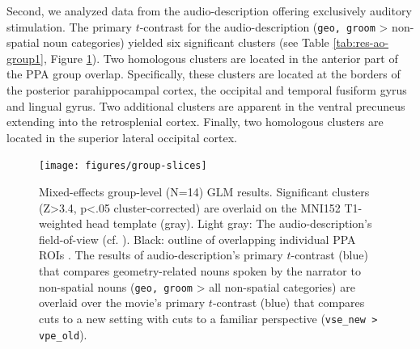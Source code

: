 \documentclass[english]{article}
\begin{document}
Second, we analyzed data from the audio-description offering exclusively
auditory stimulation.
The primary $t$-contrast for the audio-description (\texttt{geo, groom} >
non-spatial noun categories) yielded six significant clusters (see Table
\ref{tab:res-ao-group1}, Figure \ref{fig:group-slices}).
Two homologous clusters are located in the anterior part of the PPA group
overlap.
Specifically, these clusters are located at the borders of the posterior
parahippocampal cortex, the occipital and temporal fusiform gyrus and lingual
gyrus.
Two additional clusters are apparent in the ventral precuneus extending into the
retrosplenial cortex.
Finally, two homologous clusters are located in the superior lateral occipital
cortex.

\begin{figure}[h!] \centering
    \texttt{[image: figures/group-slices]}
    \caption{Mixed-effects group-level (N=14) GLM results. Significant clusters
        (Z>3.4, p<.05 cluster-corrected) are overlaid on the MNI152 T1-weighted
        head template (gray).
        Light gray: The audio-description's field-of-view
        (cf. \citep{hanke2014audiomovie}).
        Black: outline of overlapping individual PPA ROIs
        \citep{sengupta2016extension}.
        The results of audio-description's primary $t$-contrast (blue) that
        compares geometry-related nouns spoken by the narrator to non-spatial
        nouns (\texttt{geo, groom} > all non-spatial
        categories)
        are overlaid over the movie's primary $t$-contrast (blue) that compares
        cuts to a new setting with cuts to a familiar perspective
        (\texttt{vse\_new > vpe\_old}).
        }
    \label{fig:group-slices}
\end{figure}
\end{document}
